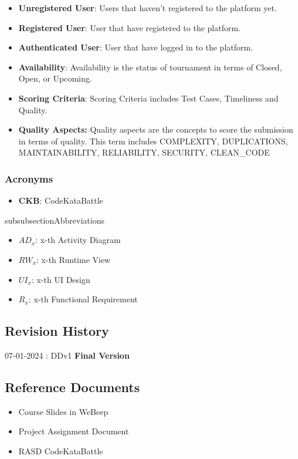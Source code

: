 \begin{itemize}
    \item \textbf{Unregistered User}: Users that haven't registered to the platform yet.
    \item \textbf{Registered User}: User that have registered to the platform.
    \item \textbf{Authenticated User}: User that have logged in to the platform.
    \item \textbf{Availability}: Availability is the status of tournament in terms of Closed, Open, or Upcoming.
    \item \textbf{Scoring Criteria}: Scoring Criteria includes Test Cases, Timeliness and Quality.
    \item \textbf{Quality Aspects:} Quality aspects are the concepts to score the submission in terms of quality. This term includes COMPLEXITY, DUPLICATIONS, MAINTAINABILITY, RELIABILITY, SECURITY, CLEAN\_CODE

\end{itemize}

\subsubsection{Acronyms}
\begin{itemize}
    \item \textbf{CKB}: CodeKataBattle
\end{itemize}

subsubsection{Abbreviations}
\begin{itemize}
    \item $AD_{x}$: x-th Activity Diagram
    \item $RW_{x}$: x-th Runtime View
    \item $UI_{x}$: x-th UI Design
    \item $R_{x}$: x-th Functional Requirement
\end{itemize}


\subsection{Revision History}
07-01-2024 : DDv1 \textbf{Final Version}

\subsection{Reference Documents}
\begin{itemize}
    \item Course Slides in WeBeep
    \item Project Assignment Document
    \item RASD CodeKataBattle
\end{itemize}
